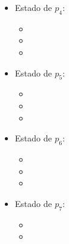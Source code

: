 \begin{multicols}{2}
\begin{itemize}
\begin{itemize}
      \item {}
      \end{itemize}

\item Estado de $p_4$:
      \begin{itemize}
      \item {}
      
      \item {}
      
      \item {}
      \end{itemize}

\item Estado de $p_5$:
      \begin{itemize}
      \item {}
      
      \item {}
      
      \item {}
      \end{itemize}

\item Estado de $p_6$:
      \begin{itemize}
      \item {}
      
      \item {}
      
      \item {}
      \end{itemize}

\item Estado de $p_7$:
      \begin{itemize}
      \item {}
      
      \item {}
      

\end{itemize}
\end{itemize}
\end{multicols}
